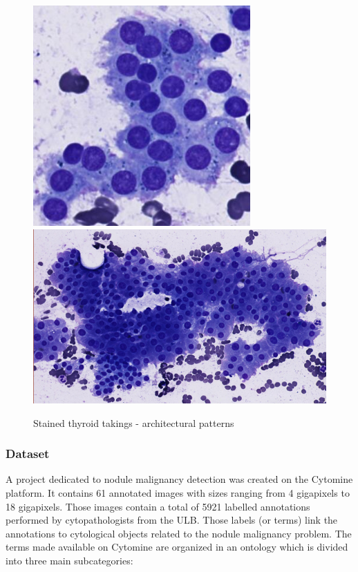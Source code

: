 \begin{figure}
{		\includegraphics[scale=0.5]{image/normal_pattern_1.png}
		\includegraphics[scale=0.5]{image/normal_pattern_2.png}
		\label{sfig:norm_patterns}
	}
	\caption{Stained thyroid takings - architectural patterns}
	\label{fig:intro_pattern_ex}
\end{figure}


\subsubsection{Dataset}
\label{sssec:detection_thyroid_dataset}
A project dedicated to nodule malignancy detection was created on the Cytomine platform. It contains 61 annotated images with sizes ranging from 4 gigapixels to 18 gigapixels. Those images contain a total of 5921 labelled annotations performed by cytopathologists from the ULB. Those labels (or terms) link the annotations to cytological objects related to the nodule malignancy problem. The terms made available on Cytomine are organized in an ontology which is divided into three main subcategories:


